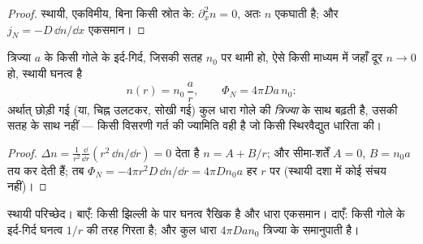\begin{proof}
स्थायी, एकविमीय, बिना किसी स्रोत के: $\partial_x^2 n = 0$, अतः $n$
एकघाती है; और $j_N = -D\,\dd n/\dd x$ एकसमान।
\end{proof}

\begin{proposition}[स्थायी दशा: गोलीय ज्यामिति]\label{prop:b2:particle-diffusion:sphere}
त्रिज्या $a$ के किसी गोले के इर्द-गिर्द, जिसकी सतह $n_0$ पर थामी हो, ऐसे किसी
माध्यम में जहाँ दूर $n \to 0$ हो, स्थायी घनत्व है
\[
n(r) = n_0\,\frac{a}{r}, \qquad
\Phi_N = 4\pi D a\,n_0 :
\]
अर्थात् छोड़ी गई (या, चिह्न उलटकर, सोखी गई) कुल धारा गोले की
\emph{त्रिज्या} के साथ बढ़ती है, उसकी सतह के साथ नहीं --- किसी विसरणी गर्त
की ज्यामिति वही है जो किसी स्थिरवैद्युत धारिता की।
\end{proposition}

\begin{proof}
$\Delta n = \frac{1}{r^2}\frac{\dd}{\dd r}(r^2\,\dd n/\dd r) = 0$ देता है
$n = A + B/r$; और सीमा-शर्तें $A = 0$, $B = n_0 a$ तय कर देती हैं; तब
$\Phi_N = -4\pi r^2 D\,\dd n/\dd r = 4\pi D n_0 a$ हर $r$ पर (स्थायी दशा में कोई
संचय नहीं)।
\end{proof}

\begin{omfigure}

{\small स्थायी परिच्छेद। बाएँ: किसी झिल्ली के पार घनत्व
रैखिक है और धारा एकसमान। दाएँ: किसी गोले के इर्द-गिर्द घनत्व
$1/r$ की तरह गिरता है; और कुल धारा $4\pi D a n_0$ त्रिज्या के
समानुपाती है।}
\end{omfigure}

